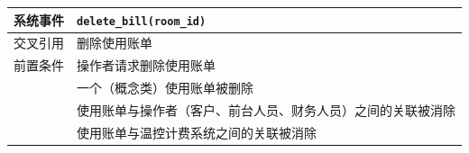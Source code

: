 \documentclass[blue,normal,cn]{elegantnote}
\newcommand{\code}[1]{\colorbox{light-gray}{\texttt{#1}}}
\begin{document}
\begin{center}
    \begin{tabular}{|>{\centering}m{}|m{}|}
        \hline
        系统事件                  & \multicolumn{1}{l|}{\code{delete\_bill(room\_id)}}           \\
        \hline
        交叉引用                  & 删除使用账单                                                 \\
        \hline
        前置条件                  & 操作者请求删除使用账单                                       \\
        \hline
        \multirow{3}{*}{后置条件} & 一个（概念类）使用账单被删除                                 \\
        \cline{2-2}
                                  & 使用账单与操作者（客户、前台人员、财务人员）之间的关联被消除 \\
        \cline{2-2}
                                  & 使用账单与温控计费系统之间的关联被消除                       \\
        \hline
    \end{tabular}
\end{center}
\end{document}
